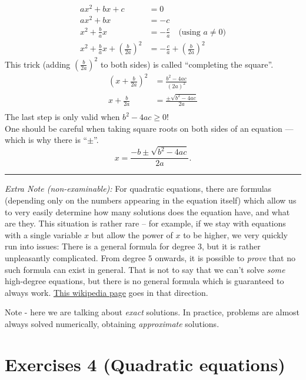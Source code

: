 \documentclass[
  english,
  12pt,
  oneside]{book}
\theoremstyle{definition}
\theoremstyle{definition}
\theoremstyle{definition}
\theoremstyle{definition}
\theoremstyle{remark}
\begin{document}
\begin{align*}
ax^2+bx+c &= 0\\
ax^2 + bx &= -c\\
x^2 + \tfrac{b}{a}x &= -\tfrac{c}{a} \quad\text{(using $a\not=0$)}\\
x^2 + \tfrac{b}{a}x + \left(\tfrac{b}{2a}\right)^2 &= -\tfrac{c}{a} + \left(\tfrac{b}{2a}\right)^2
\end{align*}
This trick (adding \(\left(\tfrac{b}{2a}\right)^2\) to both sides) is called ``completing the square''.
\begin{align*}
\left(x+\tfrac{b}{2a}\right)^2 &= \tfrac{b^2-4ac}{(2a)^2}\\
x+\tfrac{b}{2a} &= \frac{\pm\sqrt{b^2-4ac}}{2a}\\ %
\end{align*}
The last step is only valid when \(b^2-4ac\geq 0\)!\\
One should be careful when taking square roots on both sides of an equation --- which is why there is ``\(\pm\)''.
\[x = \frac{-b\pm\sqrt{b^2-4ac}}{2a}.\]

\begin{center}\rule{0.5\linewidth}{0.5pt}\end{center}

\emph{Extra Note (non-examinable):} For quadratic equations, there are formulas (depending only on the numbers appearing in the equation itself) which allow us to very easily determine how many solutions does the equation have, and what are they. This situation is rather rare -- for example, if we stay with equations with a single variable \(x\) but allow the power of \(x\) to be higher, we very quickly run into issues: There is a general formula for degree \(3\), but it is rather unpleasantly complicated. From degree \(5\) onwards, it is possible to \emph{prove} that no such formula can exist in general. That is not to say that we can't solve \emph{some} high-degree equations, but there is no general formula which is guaranteed to always work. \href{https://en.wikipedia.org/wiki/Galois_theory}{This wikipedia page} goes in that direction.

Note - here we are talking about \emph{exact} solutions. In practice, problems are almost always solved numerically, obtaining \emph{approximate} solutions.

\chapter*{Exercises 4 (Quadratic equations)}\label{exercises-4-quadratic-equations}
\end{document}
